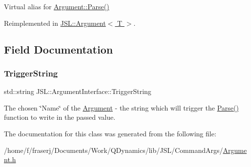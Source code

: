 Virtual alias for \hyperlink{classJSL_1_1Argument_a8984e7ce23155259d90a3e98170f36e0}{Argument\+::\+Parse()} 



Reimplemented in \hyperlink{classJSL_1_1Argument_a8984e7ce23155259d90a3e98170f36e0}{J\+S\+L\+::\+Argument$<$ T $>$}.



\subsection{Field Documentation}
\mbox{\label{classJSL_1_1ArgumentInterface_afa2d1f96c4971070d3de5824f297312f}} 
\subsubsection{\texorpdfstring{Trigger\+String}{TriggerString}}
{\footnotesize\ttfamily std\+::string J\+S\+L\+::\+Argument\+Interface\+::\+Trigger\+String\hspace{0.3cm}{\ttfamily [protected]}}



The chosen \char`\"{}\+Name\char`\"{} of the \hyperlink{classJSL_1_1Argument}{Argument} -\/ the string which will trigger the \hyperlink{classJSL_1_1ArgumentInterface_a28b487f7a4fa6e721ed6629abe2073f2}{Parse()} function to write in the passed value. 



The documentation for this class was generated from the following file\+:\begin{DoxyCompactItemize}
\item 
/home/f/fraserj/\+Documents/\+Work/\+Q\+Dynamics/lib/\+J\+S\+L/\+Command\+Args/\hyperlink{Argument_8h}{Argument.\+h}\end{DoxyCompactItemize}
